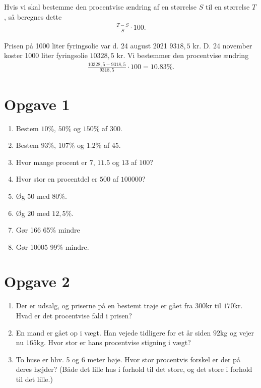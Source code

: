 \begin{regel}[Procentregneregel 4]
Hvis vi skal bestemme den procentvise ændring af en størrelse $S$ til en størrelse $T$, så beregnes dette 
\begin{align*}
\frac{T-S}{S}\cdot 100.
\end{align*}
\end{regel}
\begin{exa}
Prisen på 1000 liter fyringsolie var d. 24 august 2021 $9318,5$ kr. D. 24 november koster 1000 liter fyringsolie $10328,5$ kr. Vi bestemmer den procentvise ændring
\begin{align*}
\frac{10328,5-9318,5}{9318,5}\cdot 100 = 10.83\%. 
\end{align*}
\end{exa}
\section*{Opgave 1}
\begin{enumerate}[label=\roman*)]
\item Bestem $10\%$, $50\%$ og $150\%$ af $300$.
\item Bestem $93\%$, $107\%$ og $1.2\%$ af 45.
\item Hvor mange procent er $7$, $11.5$ og $13$ af $100$?
\item Hvor stor en procentdel er $500$ af $100000$?
\item Øg 50 med $80\%$. 
\item Øg 20 med $12,5\%$.
\item Gør 166 65$\%$ mindre
\item Gør 10005 99$\%$ mindre.
\end{enumerate}
\section*{Opgave 2}
\begin{enumerate}[label=\roman*)]
\item Der er udsalg, og priserne på en bestemt trøje er gået fra 300kr til $170$kr. Hvad er det procentvise fald i prisen?
\item En mand er gået op i vægt. Han vejede tidligere for et år siden $92$kg og vejer nu $165$kg. Hvor stor er hans procentvise stigning i vægt?
\item  To huse er  hhv. 5 og 6 meter høje. Hvor stor procentvis forskel er der på deres højder? (Både det lille hus i forhold til det store, og det store i forhold til det lille.)
\end{enumerate}